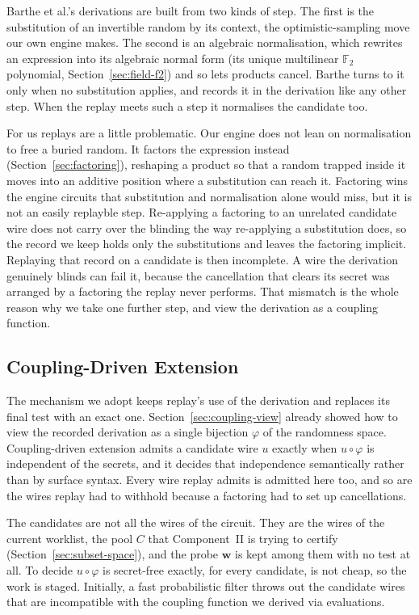   Barthe et al.'s derivations are built from two kinds of step.
  The first is the substitution of an invertible random by its context, the
  optimistic-sampling move our own engine makes. The second is an algebraic
  normalisation, which rewrites an expression into its algebraic normal form (its
  unique multilinear $\mathbb{F}_2$ polynomial, Section~\ref{sec:field-f2}) and so
  lets products cancel. Barthe turns to it only when no substitution applies, and
  records it in the derivation like any other step. When the replay meets such a
  step it normalises the candidate too.

  For us replays are a little problematic. Our engine does not lean on
  normalisation to free a buried random. It factors the expression instead
  (Section~\ref{sec:factoring}), reshaping a product so that a random trapped
  inside it moves into an additive position where a substitution can reach it.
  Factoring wins the engine circuits that substitution and normalisation alone
  would miss, but it is not an easily replayble step. Re-applying a factoring
  to an unrelated candidate wire does not carry over the blinding the way
  re-applying a substitution does, so the record we keep holds only the
  substitutions and leaves the factoring implicit. Replaying that record on a
  candidate is then incomplete. A wire the derivation genuinely blinds can fail it,
  because the cancellation that clears its secret was arranged by a factoring the
  replay never performs. That mismatch is the whole
  reason why we take one further step, and view the derivation as a coupling function.

  \subsection{Coupling-Driven Extension}
  \label{sec:coupling-extension}

  The mechanism we adopt keeps replay's use of the derivation and replaces its
  final test with an exact one. Section~\ref{sec:coupling-view} already showed how to view the
  recorded derivation as a single bijection $\varphi$ of the
  randomness space. Coupling-driven
  extension admits a candidate wire $u$ exactly when $u \circ \varphi$ is
  independent of the secrets, and it decides that independence semantically rather
  than by surface syntax. Every wire replay
  admits is admitted here too, and so are the wires replay had to withhold because a
  factoring had to set up cancellations.

  The candidates are not all the wires of the
  circuit. They are the wires of the current worklist, the pool $C$ that
  Component~II is trying to certify (Section~\ref{sec:subset-space}), and the probe
  $\mathbf{w}$ is kept among them with no test at all. To decide $u \circ
  \varphi$ is secret-free exactly, for every candidate, is not cheap, so the work is
  staged. Initially, a fast probabilistic filter throws out the candidate wires
  that are incompatible with the coupling function we derived via evaluations.

